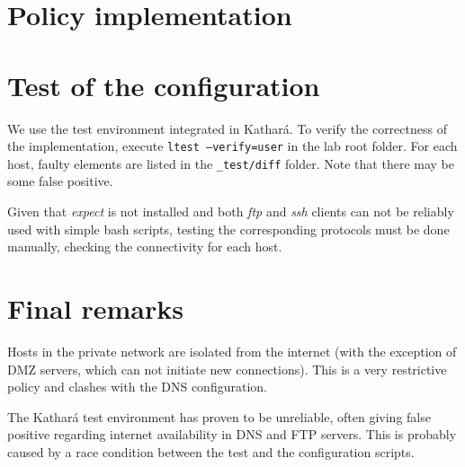 \documentclass[draft]{homework}
\newcommand{\kat}{Kathará\xspace}
\begin{document}
    
    \section{Policy implementation}
    
    
    \section{Test of the configuration}
    We use the test environment integrated in \kat.
    To verify the correctness of the implementation, execute \texttt{ltest --verify=user} in the lab root folder.
    For each host, faulty elements are listed in the \texttt{\_test/diff} folder.
    Note that there may be some false positive.
    
    Given that \textit{expect} is not installed and both \textit{ftp} and \textit{ssh} clients can not be reliably used with simple bash scripts, testing the corresponding protocols must be done manually, checking the connectivity for each host.
    
    
    \section{Final remarks}
    Hosts in the private network are isolated from the internet (with the exception of DMZ servers, which can not initiate new connections).
    This is a very restrictive policy and clashes with the DNS configuration.
    
    The \kat test environment has proven to be unreliable, often giving false positive regarding internet availability in DNS and FTP servers.
    This is probably caused by a race condition between the test and the configuration scripts.
\end{document}
